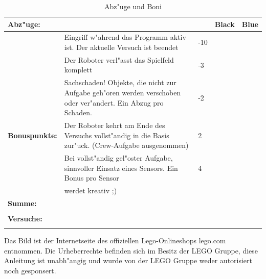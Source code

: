 \documentclass[
    DIV=calc,
    IMRAD=false,
	ngerman,
	accentcolor=1c,%
	]{tudapub}
\begin{document}
\begin{table}[h]
	\begin{tabular}{|p{}|p{}|p{}|p{}|p{}|} \hline
		\textbf{Abz"uge:}& \space &\space&\textbf{Black}&\textbf{Blue} \\ \hline 
		\space& Eingriff w"ahrend das Programm aktiv ist. Der aktuelle Versuch ist beendet &-10&\space&\space \\ \hline
		\space& Der Roboter verl"asst das Spielfeld komplett &-3&\space&\space \\ \hline
		\space& Sachschaden! Objekte, die nicht zur Aufgabe geh"oren werden verschoben oder ver"andert. Ein Abzug pro Schaden. &-2&\space&\space \\ \hline
		\textbf{Bonuspunkte:}& Der Roboter kehrt am Ende des Versuchs vollst"andig in die Basis zur"uck. (Crew-Aufgabe ausgenommen) &2&\space&\space \\ \hline
		\space& Bei vollst"andig gel"oster Aufgabe, sinnvoller Einsatz eines Sensors. Ein Bonus pro Sensor &4&\space&\space \\ \hline
		\space& werdet kreativ ;) & \space &\space&\space \\ \hline
		\textbf{Summe:}& \space &\space&\space&\space \\  
		\space& \space &\space&\space&\space \\  \hline
		\textbf{Versuche:}& \space &\space&\space&\space \\ 
		\space& \space &\space&\space&\space \\  \hline
	\end{tabular}
	\caption{Abz"uge und Boni}
\end{table}

\bigskip \bigskip \bigskip \bigskip \bigskip

\tiny Das Bild ist der Internetseite des offiziellen Lego-Onlineshops lego.com entnommen. Die Urheberrechte befinden sich im Besitz der LEGO Gruppe, diese Anleitung ist unabh"angig und wurde von der LEGO Gruppe weder autorisiert noch gesponsert.

\cfoot{\textcolor{lightgray} \today}
\end{document}
